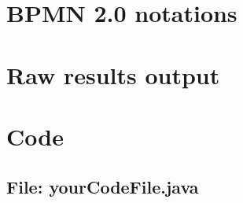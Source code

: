 \documentclass[11pt,openright,a4paper]{report}
\begin{document}
\chapter{BPMN 2.0 notations}

\chapter{Raw results output}

\chapter{Code}


\begin{landscape}
\begin{multicols}{2}
\section{File: yourCodeFile.java}

\end{multicols}
\end{landscape}
\end{document}
